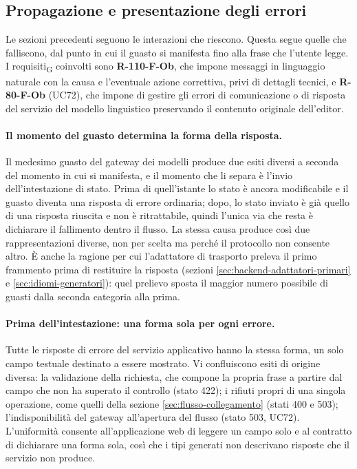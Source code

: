 \documentclass[a4paper, 10pt]{article}
\begin{document}
\subsection{Propagazione e presentazione degli errori}
\label{sec:flusso-errori}
Le sezioni precedenti seguono le interazioni che riescono. Questa segue quelle che falliscono, dal punto in cui il guasto si manifesta fino alla frase che l'utente legge. I requisiti\textsubscript{G} coinvolti sono \textbf{R-110-F-Ob}, che impone messaggi in linguaggio naturale con la causa e l'eventuale azione correttiva, privi di dettagli tecnici, e \textbf{R-80-F-Ob} (UC72), che impone di gestire gli errori di comunicazione o di risposta del servizio del modello linguistico preservando il contenuto originale dell'editor.

\paragraph{Il momento del guasto determina la forma della risposta.}
Il medesimo guasto del gateway dei modelli produce due esiti diversi a seconda del momento in cui si manifesta, e il momento che li separa è l'invio dell'intestazione di stato. Prima di quell'istante lo stato è ancora modificabile e il guasto diventa una risposta di errore ordinaria; dopo, lo stato inviato è già quello di una risposta riuscita e non è ritrattabile, quindi l'unica via che resta è dichiarare il fallimento dentro il flusso. La stessa causa produce così due rappresentazioni diverse, non per scelta ma perché il protocollo non consente altro. È anche la ragione per cui l'adattatore di trasporto preleva il primo frammento prima di restituire la risposta (sezioni \ref{sec:backend-adattatori-primari} e \ref{sec:idiomi-generatori}): quel prelievo sposta il maggior numero possibile di guasti dalla seconda categoria alla prima.

\paragraph{Prima dell'intestazione: una forma sola per ogni errore.}
Tutte le risposte di errore del servizio applicativo hanno la stessa forma, un solo campo testuale destinato a essere mostrato. Vi confluiscono esiti di origine diversa: la validazione della richiesta, che compone la propria frase a partire dal campo che non ha superato il controllo (stato 422); i rifiuti propri di una singola operazione, come quelli della sezione \ref{sec:flusso-collegamento} (stati 400 e 503); l'indisponibilità del gateway all'apertura del flusso (stato 503, UC72). L'uniformità consente all'applicazione web di leggere un campo solo e al contratto di dichiarare una forma sola, così che i tipi generati non descrivano risposte che il servizio non produce.
\end{document}
